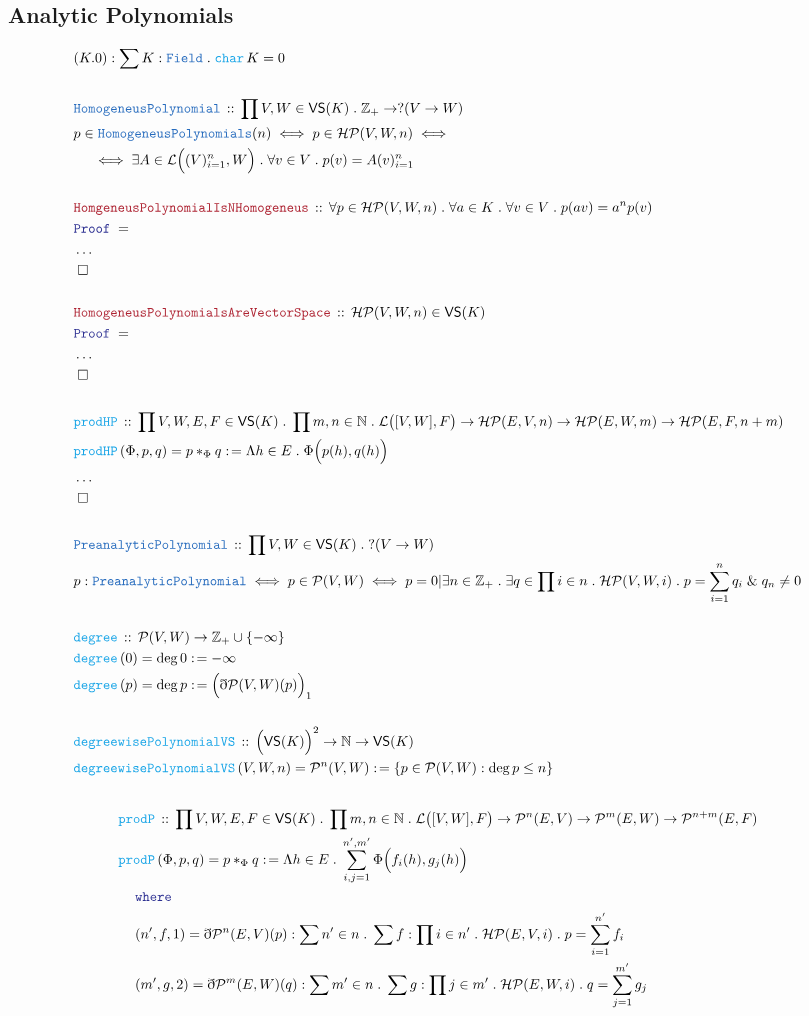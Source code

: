 \documentclass[12pt]{scrartcl}
\newcommand{\TYPE}[1]{\textcolor{NavyBlue}{\mathtt{#1}}}
\newcommand{\FUNC}[1]{\textcolor{Cerulean}{\mathtt{#1}}}
\newcommand{\LOGIC}[1]{\textcolor{Blue}{\mathtt{#1}}}
\newcommand{\THM}[1]{\textcolor{Maroon}{\mathtt{#1}}}
\renewcommand{\.}{\; . \;}
\newcommand{\de}{: \kern 0.1pc =}
\newcommand{\Act}[1]{\left( #1 \right)}
\newcommand{\Theorem}[2]{& \THM{#1} \, :: \, #2 \\ & \Proof = \\ }
\newcommand{\DeclareType}[2]{& \TYPE{#1} \, :: \, #2 \\}
\newcommand{\DefineNamedType}[4]{& #1 : \TYPE{#2} \iff #3 \iff #4 \\}
\newcommand{\DeclareFunc}[2]{& \FUNC{#1} \, :: \, #2 \\}
\newcommand{\DefineNamedFunc}[4]{&  \FUNC{#1}\Act{#2} = #3 \de #4 \\}
\newcommand{\NewLine}{\\ & \kern 1pc}
\newcommand{\Page}[1]{\begin{align*} #1 \end{align*}   }
\newcommand{ \bd }{ \ByDef }
\newcommand{\NoProof}{ & \ldots \\ \EndProof}
\renewcommand{\And}{\; \& \;}
\newcommand{\NNInt}{\mathbb{Z}_{+} }
\newcommand{\Nat}{\mathbb{N} }
\newcommand{\QED}{\; \square}
\newcommand{\EndProof}{& \QED \\}
\newcommand{\ByDef}{\eth}
\newcommand{\Proof}{\LOGIC{Proof} \; }
\newcommand{\HP}{\mathcal{HP}} %
\renewcommand{\P}{\mathcal{P}} %
\begin{document}
\subsection{Analytic Polynomials}
\Page{
& (K.0) : \sum K : \TYPE{Field} \. \FUNC{char} \, K = 0  \\
\\
\DeclareType{HomogeneusPolynomial}{ \prod V,W \in \mathsf{VS}(K) \. \NNInt \to  ? (V \to W)   }
& p \in \TYPE{HomogeneusPolynomials}(n) \iff p \in \HP(V,W,n) \iff  
\NewLine 
\iff \exists A \in \mathcal{L}\Big( (V)^n_{i = 1}, W  \Big) \. \forall v \in V \. p(v) = A(v)^n_{i = 1} \\
\\
\Theorem{HomgeneusPolynomialIsNHomogeneus}{ \forall p \in \HP(V,W,n) \. \forall a \in K \. \forall v \in V \. p(av) = a^n p(v)  }
\NoProof
\\
\Theorem{HomogeneusPolynomialsAreVectorSpace}{ \HP(V,W,n) \in \mathsf{VS}(K) }
\NoProof
\\
\DeclareFunc{prodHP}{\prod V,W,E,F \in \mathsf{VS}(K) \. \prod m,n \in \Nat \. \mathcal{L}\big([V,W],F\big) \to \HP(E,V,n) \to \HP(E,W,m) \to \HP(E,F,n + m)}
\DefineNamedFunc{ prodHP    }{\Phi,p,q}{ p *_\Phi q  }{ \Lambda h \in E \. \Phi\Big( p(h),q(h) \Big) }
\NoProof
\\
\DeclareType{PreanalyticPolynomial}{\prod V,W  \in \mathsf{VS}(K) \. ?(V \to W)}
\DefineNamedType{p}{PreanalyticPolynomial}{p \in \P(V,W)}{ p = 0 | \exists n \in \NNInt  \. \exists q \in \prod i \in n \. \HP(V,W,i) \. p = \sum^n_{i=1} q_i \And q_n \neq 0}
\\
\DeclareFunc{degree}{ \P(V,W) \to \NNInt \cup \{ - \infty \}  }
\DefineNamedFunc{degree}{0}{\deg 0}{- \infty}
\DefineNamedFunc{degree}{p}{\deg p}{\Big(\bd \P(V,W)(p) \Big)_1}
\\
\DeclareFunc{degreewisePolynomialVS}{ \Big( \mathsf{VS}(K)  \Big)^2  \to \Nat \to \mathsf{VS}(K) }
\DefineNamedFunc{degreewisePolynomialVS}{V,W,n}{\P^n(V,W)}{ \{ p \in \P(V,W) : \deg p \le n \}  }
\\
} \Page{
\DeclareFunc{prodP}{\prod V,W,E,F \in \mathsf{VS}(K) \. \prod m,n \in \Nat \. \mathcal{L}\big([V,W],F\big) \to \P^n(E,V) \to \P^m(E,W) \to \P^{n +m}(E,F)}
\DefineNamedFunc{ prodP    }{\Phi,p,q}{ p *_\Phi q  }{ \Lambda h \in E \. \sum^{n',m'}_{i,j = 1}\Phi\Big( f_i(h),g_j(h) \Big) 
\NewLine
\LOGIC{where}
\NewLine
 (n',f,1) = \bd \P^n(E,V)(p) : \sum n' \in n \. \sum f : \prod i \in n' \. \HP(E,V,i) \. p = \sum^{n'}_{i = 1} f_i \NewLine
 (m',g,2) = \bd \P^m(E,W)(q) : \sum m' \in n \. \sum g : \prod j \in m' \. \HP(E,W,i) \. q = \sum^{m'}_{j = 1} g_j 
}}
\end{document}

